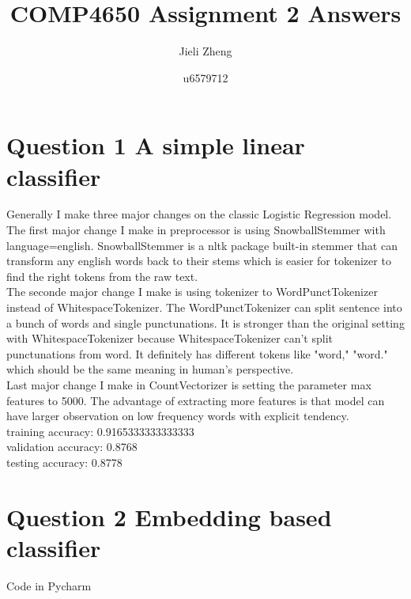 \documentclass{article} %
\title{COMP4650 Assignment 2 Answers}  %
\author{Jieli Zheng}   %
\date{u6579712}
\begin{document}
\maketitle

\section*{Question 1 A simple linear classifier}
Generally I make three major changes on the classic Logistic Regression model.\\
The first major change I make in preprocessor is using SnowballStemmer with 
language=english. SnowballStemmer is a nltk package built-in stemmer that can 
transform any english words back to their stems which is easier for tokenizer 
to find the right tokens from the raw text.\\
The seconde major change I make is using tokenizer to WordPunctTokenizer instead 
of WhitespaceTokenizer. The WordPunctTokenizer can split sentence into a bunch
of words and single punctunations. It is stronger than the original setting 
with WhitespaceTokenizer because WhitespaceTokenizer can't split punctunations 
from word. It definitely has different tokens like "word," "word." which should 
be the same meaning in human's perspective.\\
Last major change I make in CountVectorizer is setting the parameter 
max features to 5000. The advantage of extracting more features is that model 
can have larger observation on low frequency words with explicit tendency.\\
training accuracy: 0.9165333333333333\\
validation accuracy: 0.8768\\
testing accuracy: 0.8778 \\

\section*{Question 2 Embedding based classifier}
Code in Pycharm
\end{document}
